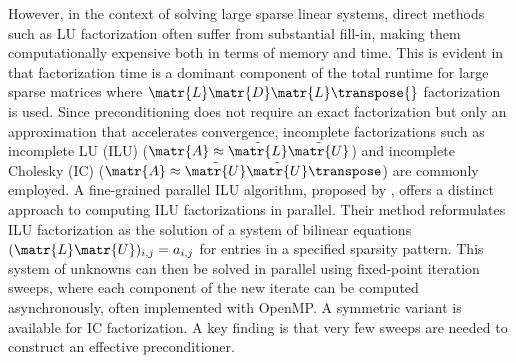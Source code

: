 However, in the context of solving large sparse linear systems, direct methods
such as LU factorization often suffer from substantial fill-in, making them
computationally expensive both in terms of memory and time. This is evident in
\cite{wong_exploring_2024} that factorization time is a dominant component of
the total runtime for large sparse matrices where \(\matr{L} \matr{D}
\matr{L}\transpose{}\) factorization is used. Since preconditioning does not
require an exact factorization but only an approximation that accelerates
convergence, incomplete factorizations such as incomplete LU (ILU) (\(\matr{A}
\approx \tilde{\matr{L}} \tilde{\matr{U}}\)) and incomplete Cholesky (IC)
(\(\matr{A} \approx \tilde{\matr{U}} \tilde{\matr{U}}\transpose\)) are commonly
employed. A fine-grained parallel ILU algorithm, proposed by
\textcite{chow_fine-grained_2015}, offers a distinct approach to computing ILU
factorizations in parallel. Their method reformulates ILU factorization as the
solution of a system of bilinear equations \((\matr{L} \matr{U})_{i,j} =
a_{i,j}\) for entries in a specified sparsity pattern. This system of unknowns
can then be solved in parallel using fixed-point iteration sweeps, where each
component of the new iterate can be computed asynchronously, often implemented
with OpenMP. A symmetric variant is available for IC factorization. A key
finding is that very few sweeps are needed to construct an effective
preconditioner.


